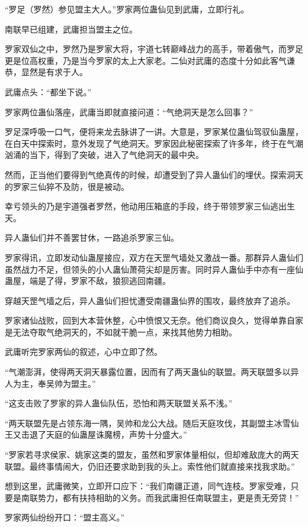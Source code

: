 \begin{this_body}
“罗足（罗然）参见盟主大人。”罗家两位蛊仙见到武庸，立即行礼。

南联早已组建，武庸担当盟主之位。

罗家双仙之中，罗然乃是罗家大将，宇道七转巅峰战力的高手，带着傲气，而罗足更是位高权重，乃是当今罗家的太上大家老。二仙对武庸的态度十分如此客气谦恭，显然是有求于人。

武庸点头：“都坐下说。”

罗家两位蛊仙落座，武庸当即就直接问道：“气绝洞天是怎么回事？”

罗足深呼吸一口气，便将来龙去脉讲了一讲。大意是，罗家某位蛊仙驾驭仙蛊屋，在白天中探索时，意外发现了气绝洞天。罗家因此秘密探索了许多年，终于在气潮汹涌的当下，得到了突破，进入了气绝洞天的最中央。

然而，正当他们要得到气绝真传的时候，却遭受到了异人蛊仙们的埋伏。探索洞天的罗家三仙猝不及防，很是被动。

幸亏领头的乃是宇道强者罗然，他动用压箱底的手段，终于带领罗家三仙逃出生天。

异人蛊仙们并不善罢甘休，一路追杀罗家三仙。

罗家得讯，立即发动仙蛊屋接应，双方在天罡气墙处又激战一番。那群异人蛊仙们虽然战力不足，但领头的小人蛊仙萧荷尖却是厉害。同时异人蛊仙手中亦有一座仙蛊屋，端是了得，罗家不敌，狼狈逃回南疆。

穿越天罡气墙之后，异人蛊仙们担忧遭受南疆蛊仙界的围攻，最终放弃了追杀。

罗家诸仙战败，回到大本营休整，心中愤恨又无奈。他们商议良久，觉得单靠自家是无法夺取气绝洞天的，不如就干脆一点，来找其他势力相助。

武庸听完罗家两仙的叙述，心中立即了然。

“气潮澎湃，使得两天洞天暴露位置，因而有了两天蛊仙的联盟。两天联盟多以异人为主，奉吴帅为盟主。”

“这支击败了罗家的异人蛊仙队伍，恐怕和两天联盟关系不浅。”

“两天联盟先是占领东海一隅，吴帅和龙公大战。随后天庭攻伐，其副盟主冰雪仙王又击退了天庭的仙蛊屋诛魔榜，声势十分盛大。”

“罗家若寻求侯家、姚家这类的盟友，虽然和罗家体量相似，但却难敌庞大的两天联盟。最终事情闹大，仍旧还要求助到我的头上。索性他们就直接来找我求助。”

想到这里，武庸微笑，立即开口应下：“我们南疆正道，同气连枝。罗家受难，只要是南联势力，都有扶持相助的义务。而我武庸担任南联盟主，更是责无旁贷！”

罗家两仙纷纷开口：“盟主高义。”


\end{this_body}
